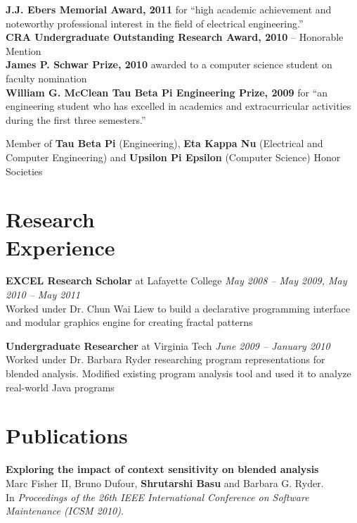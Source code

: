 \documentclass[margin,line]{resume}
\begin{document}
\begin{resume}
    {\bf J.J. Ebers Memorial Award, 2011} for ``high academic achievement and
    noteworthy professional interest in the field of electrical engineering.''\\
    {\bf CRA Undergraduate Outstanding Research Award, 2010} -- Honorable
    Mention \\
    {\bf James P. Schwar Prize, 2010} awarded to a computer science student on
    faculty nomination \\
    {\bf William G. McClean Tau Beta Pi Engineering Prize, 2009} for ``an
    engineering student who has excelled in academics and extracurricular
    activities during the first three semesters.''

    Member of {\bf Tau Beta Pi} (Engineering), {\bf Eta Kappa Nu} (Electrical
    and Computer Engineering) and {\bf Upsilon Pi Epsilon} (Computer Science)
    Honor Societies

    \section{Research\\Experience}

    {\bf EXCEL Research Scholar} at Lafayette College \hfill
    {\it May 2008 -- May 2009, May 2010 -- May 2011}\\
    Worked under Dr. Chun Wai Liew to build a declarative programming interface
    and modular graphics engine for creating fractal patterns

    {\bf Undergraduate Researcher} at Virginia Tech \hfill
    {\it June 2009 -- January 2010}\\
    Worked under Dr. Barbara Ryder researching program representations for
    blended analysis. Modified existing program analysis tool and used it to
    analyze real-world Java programs


    \section{Publications}
    {\bf Exploring the impact of context sensitivity on blended analysis} \\
    Marc Fisher II, Bruno Dufour, {\bf Shrutarshi Basu} and Barbara G. Ryder.\\
    In \emph{Proceedings of the 26th IEEE International Conference on Software
      Maintenance (ICSM 2010)}.


\end{resume}
\end{document}
